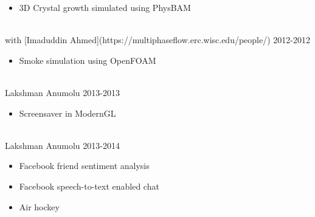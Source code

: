 \documentclass{res}
\begin{document}
\begin{resume}
\begin{itemize}[leftmargin=\parindent]
	\item 3D Crystal growth simulated using PhysBAM
	\end{itemize}
	
	\hspace*{-0.25in}{\bf Simulation of Smoke in OpenFOAM Framework} \\
	\hspace*{-0.25in}with [Imaduddin Ahmed](https://multiphaseflow.erc.wisc.edu/people/) \hfill 2012-2012
	\begin{itemize}[leftmargin=\parindent]
	\setlength{\itemsep}{0mm} \smallskip
	
	\item Smoke simulation using OpenFOAM
	\end{itemize}
	
	\hspace*{-0.25in}{\bf Screensaver using ModernGL} \\
	\hspace*{-0.25in}Lakshman Anumolu \hfill 2013-2013
	\begin{itemize}[leftmargin=\parindent]
	\setlength{\itemsep}{0mm} \smallskip
	
	\item Screensaver in ModernGL
	\end{itemize}
	
	\hspace*{-0.25in}{\bf Desktop, web apps, games built while learning app development} \\
	\hspace*{-0.25in}Lakshman Anumolu \hfill 2013-2014
	\begin{itemize}[leftmargin=\parindent]
	\setlength{\itemsep}{0mm} \smallskip
	
	\item Facebook friend sentiment analysis
	\item Facebook speech-to-text enabled chat
	\item Air hockey
	\end{itemize}
	
	
	
	
	
	
	
	
	
	
	
	
	
	\end{resume}
	
\end{document}
